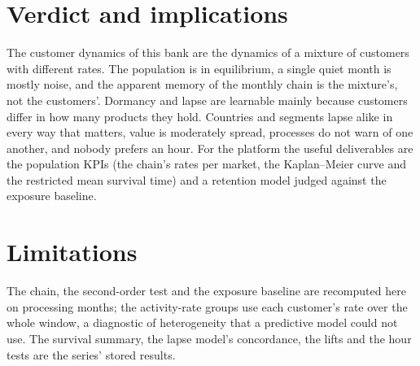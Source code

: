 \section{Verdict and implications}\label{sec:cd-verdict}

The customer dynamics of this bank are the dynamics of a mixture of customers with different rates. The population is in
equilibrium, a single quiet month is mostly noise, and the apparent memory of the monthly chain is the mixture's, not the
customers'. Dormancy and lapse are learnable mainly because customers differ in how many products they hold. Countries and
segments lapse alike in every way that matters, value is moderately spread, processes do not warn of one another, and nobody
prefers an hour. For the platform the useful deliverables are the population KPIs (the chain's rates per market, the
Kaplan--Meier curve and the restricted mean survival time) and a retention model judged against the exposure baseline.

\section{Limitations}\label{sec:cd-limits}

The chain, the second-order test and the exposure baseline are recomputed here on processing months; the activity-rate groups
use each customer's rate over the whole window, a diagnostic of heterogeneity that a predictive model could not use. The
survival summary, the lapse model's concordance, the lifts and the hour tests are the series' stored results.
